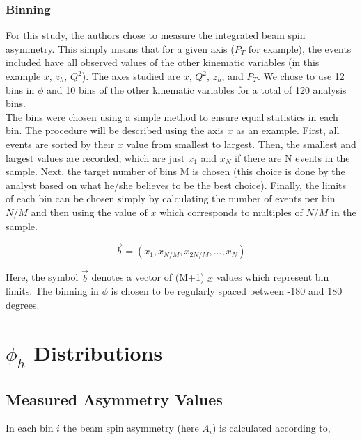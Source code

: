 
\subsubsection*{Binning}

For this study, the authors chose to measure the integrated beam spin asymmetry.  This simply means that for a given axis ($P_T$ for example), the events included have all observed values of the other kinematic variables (in this example $x$, $z_h$, $Q^2$).  The axes studied are $x$, $Q^2$, $z_h$, and $P_T$.  We chose to use 12 bins in $\phi$ and 10 bins of the other kinematic variables for a total of 120 analysis bins. \\

The bins were chosen using a simple method to ensure equal statistics in each bin.  The procedure will be described using the axis $x$ as an example.  First, all events are sorted by their $x$ value from smallest to largest.  Then, the smallest and largest values are recorded, which are just $x_1$ and $x_N$ if there are N events in the sample.  Next, the target number of bins M is chosen (this choice is done by the analyst based on what he/she believes to be the best choice).  Finally, the limits of each bin can be chosen simply by calculating the number of events per bin $N/M$ and then using the value of $x$ which corresponds to multiples of $N/M$ in the sample.    

\begin{equation}
  \vec{b} = (x_1, x_{N/M}, x_{2N/M}, ..., x_N)
\end{equation}

Here, the symbol $\vec{b}$ denotes a vector of (M+1) $x$ values which represent bin limits.  The binning in $\phi$ is chosen to be regularly spaced between -180 and 180 degrees.

\section{$\phi_h$ Distributions}
\subsection*{Measured Asymmetry Values}
In each bin $i$ the beam spin asymmetry (here $A_i$) is calculated according to, 

